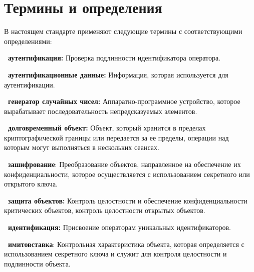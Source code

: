 \chapter{Термины и определения}\label{Terms}

В настоящем стандарте применяют  
%
%
следующие термины с соответствующими определениями:

{\bf \thedefctr~аутентификация:}
Проверка подлинности идентификатора оператора.


{\bf \thedefctr~аутентификационные данные:}
Информация, которая используется для аутентификации.


{\bf \thedefctr~генератор случайных чисел:}
Аппаратно-программное устройство, 
которое вырабатывает последовательность непредсказуемых 
элементов.


{\bf \thedefctr~долговременный объект:}
Объект, который хранится в пределах криптографической границы или передается
за ее пределы, операции над которым могут выполняться в нескольких сеансах.

{\bf \thedefctr~зашифрование}:
Преобразование объектов,
направленное на обеспечение их конфиденциальности,
которое осуществляется с использованием секретного или открытого ключа.


{\bf \thedefctr~защита объектов:}
Контроль целостности и обеспечение конфиденциальности критических объектов,
контроль целостности открытых объектов.

{\bf \thedefctr~идентификация:}
Присвоение операторам уникальных идентификаторов.

{\bf \thedefctr~имитовставка}:
Контрольная характеристика объекта, 
которая определяется с использованием секретного ключа 
и служит для контроля целостности и подлинности объекта.



